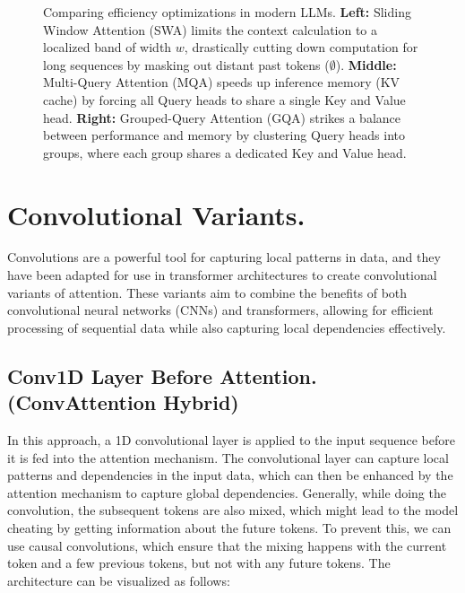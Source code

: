 \documentclass[10pt]{article}
\theoremstyle{plain}
\begin{document}
\begin{figure}[H]
{
}
\caption{%
  Comparing efficiency optimizations in modern LLMs. \textbf{Left:} Sliding Window Attention (SWA) limits the context calculation to a localized band of width $w$, drastically cutting down computation for long sequences by masking out distant past tokens ($\emptyset$). \textbf{Middle:} Multi-Query Attention (MQA) speeds up inference memory (KV cache) by forcing all Query heads to share a single Key and Value head. \textbf{Right:} Grouped-Query Attention (GQA) strikes a balance between performance and memory by clustering Query heads into groups, where each group shares a dedicated Key and Value head.%
}
\label{fig:attention_variants}
\end{figure}

\newpage

\section{Convolutional Variants.}

Convolutions are a powerful tool for capturing local patterns in data, and they have been adapted for use in transformer architectures to create convolutional variants of attention. These variants aim to combine the benefits of both convolutional neural networks (CNNs) and transformers, allowing for efficient processing of sequential data while also capturing local dependencies effectively.

\subsection{Conv1D Layer Before Attention. (ConvAttention Hybrid)}

In this approach, a 1D convolutional layer is applied to the input sequence before it is fed into the attention mechanism. The convolutional layer can capture local patterns and dependencies in the input data, which can then be enhanced by the attention mechanism to capture global dependencies. Generally, while doing the convolution, the subsequent tokens are also mixed, which might lead to the model cheating by getting information about the future tokens. To prevent this, we can use causal convolutions, which ensure that the mixing happens with the current token and a few previous tokens, but not with any future tokens. The architecture can be visualized as follows:
\end{document}
